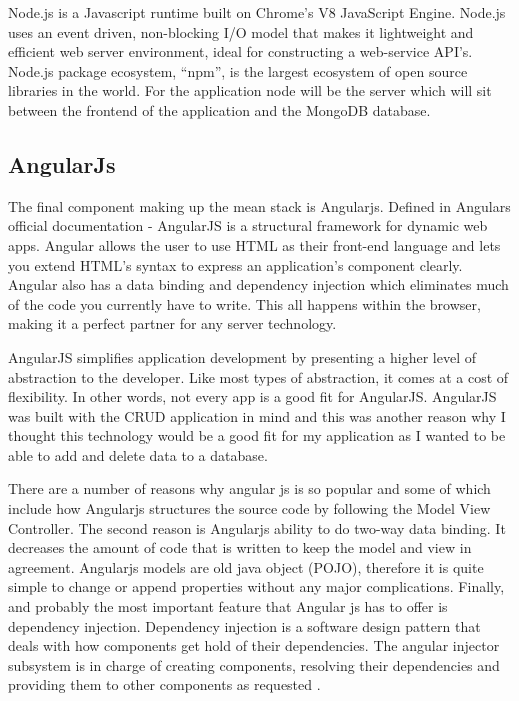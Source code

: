 Node.js is a Javascript runtime built on Chrome’s V8 JavaScript Engine.
Node.js uses an event driven, non-blocking I/O model that makes it lightweight
and efficient web server environment, ideal for constructing a web-service
API’s. Node.js package ecosystem, “npm”, is the largest ecosystem of open
source libraries in the world. For the application node will be the server which will sit between the frontend of the application and the MongoDB database.\cite{nodejs}

\subsection{AngularJs}
The final component making up the mean stack is Angularjs. Defined in Angulars official documentation\cite{angularjs} - AngularJS is a structural framework for dynamic
web apps. Angular allows the user to use HTML as their front-end language and lets you extend HTML’s syntax to express an application’s component clearly. Angular also has a data binding and dependency injection which eliminates much
of the code you currently have to write. This all happens within the
browser, making it a perfect partner for any server technology.

AngularJS simplifies application development by presenting a higher level of abstraction to the developer. Like most types of abstraction, it comes at a cost of flexibility. In other words, not every app is a good fit for AngularJS. AngularJS was built with the CRUD application in mind and this was another reason why I thought this technology would be a good fit for my application as I wanted to be able to add and delete data to a database. \cite{angularjsa}
 
There are a number of reasons why angular js is so popular and some of which include how Angularjs structures the source code by following
the Model View Controller. The second reason is  Angularjs ability to do two-way data binding. It decreases the amount of code
that is written to keep the model and view in agreement.  Angularjs
models are old java object (POJO), therefore it is quite simple to change or
append properties without any major complications. Finally, and probably the most important
feature that Angular js has to offer is dependency injection. Dependency injection
is a software design pattern that deals with how components get hold of
their dependencies. The angular injector subsystem is in charge of creating components, resolving their dependencies and providing them to other
components as requested \cite{angularjsfeat}.

